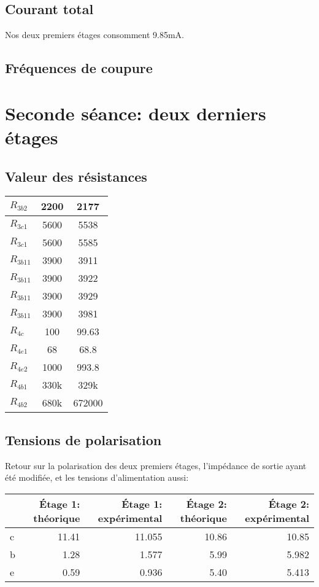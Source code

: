 \subsection{Courant total}
Nos deux premiers étages consomment 9.85mA.

\subsection{Fréquences de coupure}

\section{Seconde séance: deux derniers étages}

\subsection{Valeur des résistances}
\begin{tabular}{|l|c|c|}
    \hline
    $R_{3b2}$ & 2200 & 2177 \\
    \hline
    $R_{3c1}$ & 5600 & 5538 \\
    \hline
    $R_{3c1}$ & 5600 & 5585 \\
    \hline
    $R_{3b11}$ & 3900 & 3911 \\
    \hline
    $R_{3b11}$ & 3900 & 3922 \\
    \hline
    $R_{3b11}$ & 3900 & 3929 \\
    \hline
    $R_{3b11}$ & 3900 & 3981 \\
    \hline
    \hline
    $R_{4c}$ & 100 & 99.63 \\
    \hline
    $R_{4e1}$ & 68 & 68.8 \\
    \hline
    $R_{4e2}$ & 1000 & 993.8 \\
    \hline
    $R_{4b1}$ & 330k & 329k \\
    \hline
    $R_{4b2}$ & 680k & 672000 \\
    \hline
\end{tabular}

\subsection{Tensions de polarisation}
Retour sur la polarisation des deux premiers étages, l’impédance de sortie ayant été modifiée, et les tensions d’alimentation aussi:
\begin{tabular}{|l|r|r|r|r|}
    \hline
    & Étage 1: théorique & Étage 1: expérimental & Étage 2: théorique & Étage 2: expérimental \\
    \hline
    c & 11.41 & 11.055 & 10.86 & 10.85 \\
    \hline
    b &  1.28 & 1.577  &  5.99 & 5.982 \\
    \hline
    e &  0.59 & 0.936  &  5.40 & 5.413 \\
    \hline
\end{tabular}


